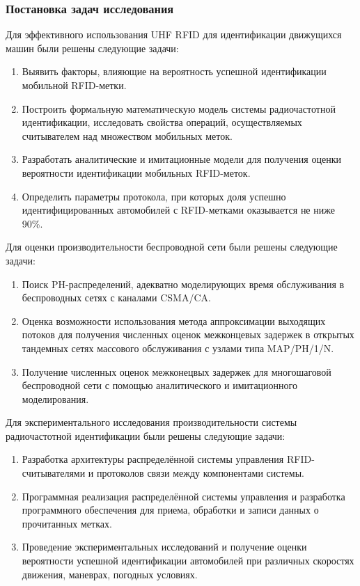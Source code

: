 \begin{frame}[allowframebreaks]
    \frametitle{Постановка задач исследования}
    Для эффективного использования UHF RFID для идентификации движущихся машин были решены следующие задачи:
    \begin{enumerate}
        \item Выявить факторы, влияющие на вероятность успешной идентификации мобильной RFID-метки.
        \item Построить формальную математическую модель системы радиочастотной идентификации, исследовать свойства операций, осуществляемых считывателем над множеством мобильных меток.
        \item Разработать аналитические и имитационные модели для получения оценки вероятности идентификации мобильных RFID-меток.
        \item Определить параметры протокола, при которых доля успешно идентифицированных автомобилей с RFID-метками оказывается не ниже 90\%.
    \end{enumerate}
    \framebreak
    Для оценки производительности беспроводной сети были решены следующие задачи:
    \begin{enumerate}
        \item Поиск PH-распределений, адекватно моделирующих время обслуживания в беспроводных сетях с каналами CSMA/CA.
        \item Оценка возможности использования метода аппроксимации выходящих потоков для получения численных оценок межконцевых задержек в открытых тандемных сетях массового обслуживания с узлами типа MAP/PH/1/N.
        \item Получение численных оценок межконецвых задержек для многошаговой беспроводной сети с помощью аналитического и имитационного моделирования.
    \end{enumerate}
    \framebreak
    Для экспериментального исследования производительности системы радиочастотной идентификации были решены следующие задачи:
    \begin{enumerate}
        \item Разработка архитектуры распределённой системы управления RFID-считывателями и протоколов связи между компонентами системы.
        \item Программная реализация распределённой системы управления и разработка программного обеспечения для приема, обработки и записи данных о прочитанных метках.
        \item Проведение экспериментальных исследований и получение оценки вероятности успешной идентификации автомобилей при различных скоростях движения, маневрах, погодных условиях.
    \end{enumerate}
\end{frame}


